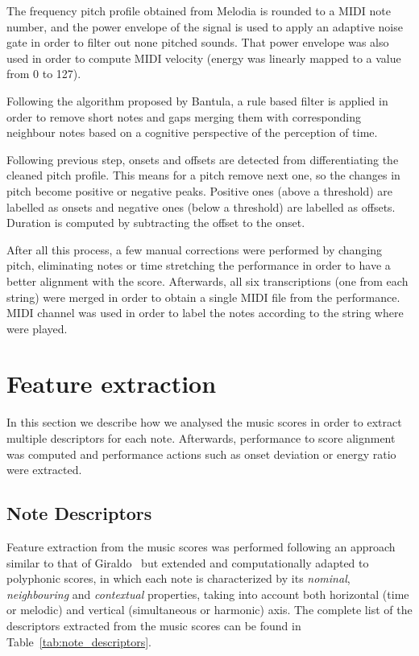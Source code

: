 The frequency pitch profile obtained from Melodia is rounded to a MIDI note number, and the power envelope of the signal is used to apply an adaptive noise gate in order to filter out none pitched sounds. That power envelope was also used in order to compute MIDI velocity (energy was linearly mapped to a value from 0 to 127). 

Following the algorithm proposed by Bantula, a rule based filter is applied in order to remove short notes and gaps merging them with corresponding neighbour notes based on a cognitive perspective of the perception of time.

Following previous step, onsets and offsets are detected from differentiating the cleaned pitch profile. This means for a pitch remove next one, so the changes in pitch become positive or negative peaks. Positive ones (above a threshold) are labelled as onsets and negative ones (below a threshold) are labelled as offsets. Duration is computed by subtracting the offset to the onset.

After all this process, a few manual corrections were performed by changing pitch, eliminating notes or time stretching the performance in order to have a better alignment with the score. Afterwards, all six transcriptions (one from each string) were merged in order to obtain a single MIDI file from the performance. MIDI channel was used in order to label the notes according to the string where were played.

\section{Feature extraction}
In this section we describe how we analysed the music scores in order to extract multiple descriptors for each note. Afterwards, performance to score alignment was computed and performance actions such as onset deviation or energy ratio were extracted.

\subsection{Note Descriptors}
Feature extraction from the music scores was performed following an approach similar to that of Giraldo~\cite{Giraldo2016} but extended and computationally adapted to polyphonic scores, in which each note is characterized by its \textit{nominal}, \textit{neighbouring} and \textit{contextual} properties, taking into account both horizontal (time or melodic) and vertical (simultaneous or harmonic) axis. The complete list of the descriptors extracted from the music scores can be found in Table~\ref{tab:note_descriptors}.

